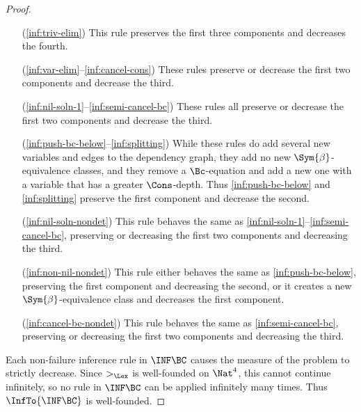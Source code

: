 \begin{proof}
    \begin{itemize}[align=left]
        \item[(\ref{inf:triv-elim})] This rule preserves the first three
            components and decreases the fourth.

        \item[(\ref{inf:var-elim}--\ref{inf:cancel-cons})] These rules preserve
            or decrease the first two components and decrease the third.
    \end{itemize}

    \begin{itemize}[align=left]
        \item[(\ref{inf:nil-soln-1}--\ref{inf:semi-cancel-bc})] These rules all
            preserve or decrease the first two components and decrease the
            third.

        \item[(\ref{inf:push-bc-below}--\ref{inf:splitting})] While these rules
            do add several new variables and edges to the dependency graph,
            they add no new $\Sym{\beta}$-equivalence classes, and they remove
            a $\Bc$-equation and add a new one with a variable that has a
            greater $\Cons$-depth. Thus \ref{inf:push-bc-below} and
            \ref{inf:splitting} preserve the first component and decrease the
            second.

        \item[(\ref{inf:nil-soln-nondet})] This rule behaves the same as
            \ref{inf:nil-soln-1}--\ref{inf:semi-cancel-bc}, preserving or
            decreasing the first two components and decreasing the third.

        \item[(\ref{inf:non-nil-nondet})] This rule either behaves the same as
            \ref{inf:push-bc-below}, preserving the first component and
            decreasing the second, or it creates a new
            $\Sym{\beta}$-equivalence class and decreases the first component.

        \item[(\ref{inf:cancel-bc-nondet})] This rule behaves the same as
            \ref{inf:semi-cancel-bc}, preserving or decreasing the first two
            components and decreasing the third.
    \end{itemize}

    Each non-failure inference rule in $\INF\BC$ causes the measure of the
    problem to strictly decrease. Since $>_\Lex$ is well-founded on $\Nat^4$,
    this cannot continue infinitely, so no rule in $\INF\BC$ can be applied
    infinitely many times. Thus $\InfTo{\INF\BC}$ is well-founded.
\end{proof}

